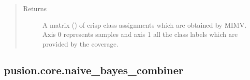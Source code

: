 \documentclass[letterpaper,10pt,english]{sphinxmanual}
\begin{document}
\begin{fulllineitems}
\begin{fulllineitems}
\begin{quote}
\begin{description}
\item[{Returns}] \leavevmode
\sphinxAtStartPar
A matrix () of crisp class assignments which are obtained by MIMV. Axis 0 represents
samples and axis 1 all the class labels which are provided by the coverage.

\end{description}\end{quote}

\end{fulllineitems}


\end{fulllineitems}



\subsection{pusion.core.naive\_bayes\_combiner}
\label{\detokenize{pusion.core.naive_bayes_combiner:module-pusion.core.naive_bayes_combiner}}\label{\detokenize{pusion.core.naive_bayes_combiner:pusion-core-naive-bayes-combiner}}\label{\detokenize{pusion.core.naive_bayes_combiner:nb-cref}}\label{\detokenize{pusion.core.naive_bayes_combiner::doc}}
\end{document}
